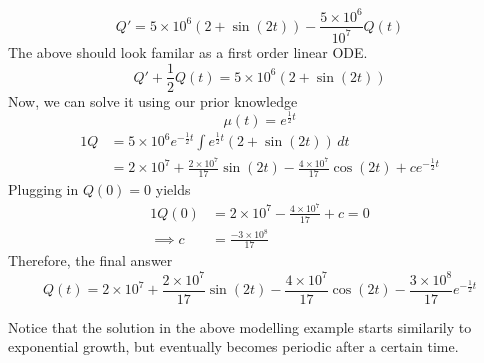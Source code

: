 \documentclass[diffeq.tex]{subfiles}
\begin{document}
\begin{example}[Modelling]
        \begin{equation}
            Q' = 5\times 10^{6}(2 + \sin(2t)) - \frac{5\times 10^{6}}{10^{7}}Q(t)
        \end{equation}
        The above should look familar as a first order linear ODE.
        \begin{equation}
            Q' + \frac{1}{2}Q(t) = 5 \times 10^{6}(2 + \sin(2t))
        \end{equation}
        Now, we can solve it using our prior knowledge
        \begin{equation}
            \mu(t) = e^{\frac{1}{2}t}
        \end{equation}
        \begin{alignat}{1}
            Q &= 5 \times 10^{6}e^{-\frac{1}{2}t}\int e^{\frac{1}{2}t}(2 + \sin(2t))\,dt\\
            &= 2 \times 10^{7} + \frac{2 \times 10^{7}}{17}\sin(2t) - \frac{4 \times 10^{7}}{17}\cos(2t) + ce^{-\frac{1}{2}t}
        \end{alignat}
        Plugging in $Q(0) = 0$ yields
        \begin{alignat}{1}
            Q(0) &= 2 \times 10^{7} - \frac{4 \times 10^{7}}{17} + c = 0\\
            \implies c &= \frac{-3 \times 10^{8}}{17}
        \end{alignat}
        Therefore, the final answer
        \begin{equation}
            Q(t) = 2 \times 10^{7} + \frac{2 \times 10^{7}}{17}\sin(2t) - \frac{4 \times 10^{7}}{17}\cos(2t) - \frac{3 \times 10^{8}}{17}e^{-\frac{1}{2}t}
        \end{equation}
    \end{example}
    \begin{remark}
        Notice that the solution in the above modelling example starts similarily to exponential growth, but eventually becomes periodic after a certain time.
    \end{remark}
\end{document}
